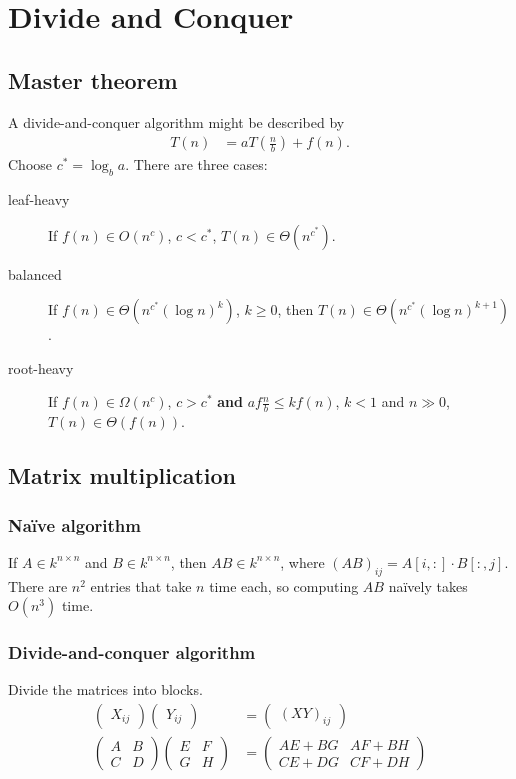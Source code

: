 \chapter{Divide and Conquer}
\section{Master theorem}
A divide-and-conquer algorithm might be described by 
\begin{align}
	T(n) &= aT\left(\frac{n}{b}\right) + f(n).
\end{align}
Choose \(c^* = \log_b a\). There are three cases:
\begin{description}
	\item[leaf-heavy] If \(f(n) \in O\left(n^c\right)\), \(c< c^*\), \(T(n) \in \Theta(n^{c^*})\).
	\item[balanced] If \(f(n) \in\Theta\left(n^{c^*}\left(\log n\right)^k\right)\), \(k \ge 0\), then \(T(n)\in\Theta\left(n^{c^*}\left(\log n\right)^{k + 1}\right)\).
	\item[root-heavy] If \(f(n)\in\Omega\left(n^c\right)\), \(c > c^*\) \textbf{and} \(af\frac{n}{b} \leq kf(n)\), \(k < 1\) and \(n\gg 0\), \(T(n) \in \Theta\left(f(n)\right)\).
\end{description}

\section{Matrix multiplication}
\subsection{Na\"ive algorithm}
If \(A \in k^{n\times n}\) and \(B \in k^{n\times n}\), then \(AB \in k^{n\times n}\), where \(\left(AB\right)_{ij} = A[i,:] \cdot B[:,j]\). There are \(n^2\) entries that take \(n\) time each, so computing \(AB\) na\"ively takes \(O(n^3)\) time.

\subsection{Divide-and-conquer algorithm}
Divide the matrices into blocks.
\begin{align}
	\begin{pmatrix}
		X_{ij}
	\end{pmatrix}
	\begin{pmatrix}
		Y_{ij}
	\end{pmatrix}
	&=
	\begin{pmatrix}
		\left(XY\right)_{ij}
	\end{pmatrix}\\
	\begin{pmatrix}
		A & B \\
		C & D
	\end{pmatrix}
	\begin{pmatrix}
		E & F \\
		G & H
	\end{pmatrix}
	&=
	\begin{pmatrix}
		AE + BG & AF + BH \\
		CE + DG &  CF + DH
	\end{pmatrix}
\end{align}

